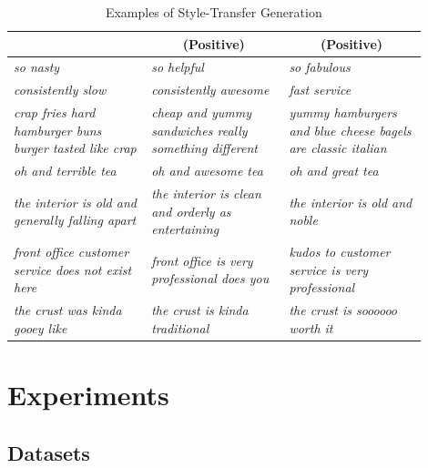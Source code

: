 \documentclass[11pt,a4paper]{article}
\newcommand{\tabh}[1]{\multicolumn{1}{c|}{\textbf{#1}}}
\begin{document}
\begin{table}[ht]
\begin{tabular}{| p{0.3\linewidth} | p{0.3\linewidth} | p{0.3\linewidth} |}
		                                                                & \tabh{(Positive)}                                                       & \tabh{(Positive)}                                                    \\
		\hline
		\hline
		\textit{so nasty}                                               & \textit{so helpful}                                                     & \textit{so fabulous}                                                 \\
		\hline
		\textit{consistently slow}                                      & \textit{consistently awesome}                                           & \textit{fast service}                                                \\
		\hline
		\textit{crap fries hard hamburger buns burger tasted like crap} & \textit{cheap and yummy sandwiches really something different}          & \textit{yummy hamburgers and blue cheese bagels are classic italian} \\
		\hline
		\textit{oh and terrible tea}                                    & \textit{oh and awesome tea}                                             & \textit{oh and great tea}                                            \\
		\hline
		\textit{the interior is old and generally falling apart}        & \textit{the interior is clean and orderly as entertaining}              & \textit{the interior is old and noble}                               \\
		\hline
		\textit{front office customer service does not exist here}      & \textit{front office is very professional does you}                     & \textit{kudos to customer service is very professional}              \\
		\hline
		\textit{the crust was kinda gooey like}                         & \textit{the crust is kinda traditional}                                 & \textit{the crust is soooooo worth it}                               \\
		\hline
	\end{tabular}
	\caption{Examples of Style-Transfer Generation}
	\label{tab:transfer-samples}
\end{table}

\section{Experiments}

\subsection{Datasets}
\end{document}
